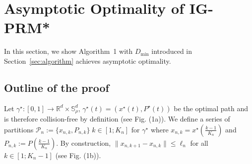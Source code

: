 \documentclass[Afour,sageh,times]{sagej}
\begin{document}


\section{Asymptotic Optimality of IG-PRM* \label{sec:optimality}}
In this section, we show Algorithm~1 with $D_{\text{min}}$ introduced in Section~\ref{sec:algorithm} achieves asymptotic optimality.

\subsection{Outline of the proof\label{subsection:outline_of_proof}}
Let $\gamma^\star: [0,1]\rightarrow \mathbb{R}^d\times \mathbb{S}_\rho^d$, $\gamma^\star(t)=(x^\star(t), P^\star(t))$ be the optimal path and is therefore collision-free by definition (see Fig. (1a)).  We define a series of partitions $\mathcal{P}_n:=\{x_{n,k},P_{n,k}\}\;k\in[1;K_n]$ for $\gamma^{\star}$ where $x_{n,k}=x^\star\left(\frac{k-1}{K_n}\right)$ and $P_{n,k}:=P\left(\frac{k-1}{K_n}\right)$. By construction, $\|x_{n,k+1}-x_{n,k}\|\leq\ell_n$ for all $k\in[1;K_n-1]$ (see Fig. (1b)). 
\end{document}
